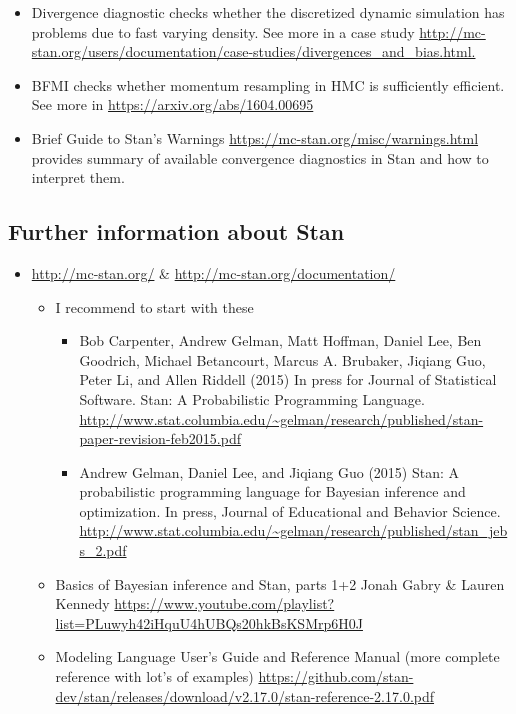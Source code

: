 \documentclass[a4paper,11pt,english]{article}
\begin{document}
\begin{itemize}
\item Divergence diagnostic checks whether the discretized dynamic
simulation has problems due to fast varying density. See more in a
case study
\url{http://mc-stan.org/users/documentation/case-studies/divergences_and_bias.html.}
\item BFMI checks whether momentum resampling in HMC is sufficiently efficient. See more in
\url{https://arxiv.org/abs/1604.00695}
\item Brief Guide to Stan's Warnings
\url{https://mc-stan.org/misc/warnings.html} provides summary of
available convergence diagnostics in Stan and how to interpret them.
\end{itemize}
\subsection*{Further information about Stan}

\begin{itemize}
\item \url{http://mc-stan.org/} \& \url{http://mc-stan.org/documentation/}
  \begin{itemize}
  \item I recommend to start with these
    \begin{itemize}
    \item Bob Carpenter, Andrew Gelman, Matt Hoffman, Daniel Lee, Ben
      Goodrich, Michael Betancourt, Marcus A. Brubaker, Jiqiang Guo,
      Peter Li, and Allen Riddell (2015) In press for Journal of
      Statistical Software. Stan: A Probabilistic Programming
      Language. \url{http://www.stat.columbia.edu/~gelman/research/published/stan-paper-revision-feb2015.pdf}
    \item Andrew Gelman, Daniel Lee, and Jiqiang Guo (2015) Stan: A
      probabilistic programming language for Bayesian inference and
      optimization. In press, Journal of Educational and Behavior
      Science. \url{http://www.stat.columbia.edu/~gelman/research/published/stan_jebs_2.pdf}
    \end{itemize}
  \item Basics of Bayesian inference and Stan, parts 1+2 Jonah Gabry \& Lauren Kennedy \url{https://www.youtube.com/playlist?list=PLuwyh42iHquU4hUBQs20hkBsKSMrp6H0J}
  \item Modeling Language User's Guide and Reference Manual (more complete reference with lot's of examples) \url{https://github.com/stan-dev/stan/releases/download/v2.17.0/stan-reference-2.17.0.pdf}
  \end{itemize}
\end{itemize}
\end{document}
